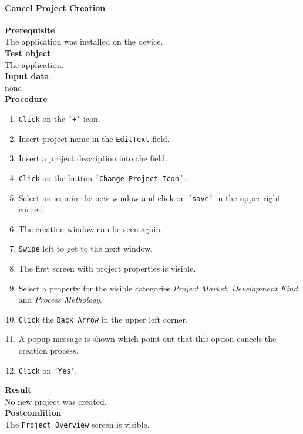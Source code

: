 \paragraph*{\textbf{Cancel Project Creation}}
\textbf{Prerequisite}\\
The application was installed on the device.\\
\textbf{Test object}\\
The application.\\
\textbf{Input data}\\
none\\
\textbf{Procedure}
\begin{enumerate}
	\item \texttt{Click} on the \texttt{'+'} icon.
	\item Insert project name in the \texttt{EditText} field.
	\item Insert a project description into the field.
	\item \texttt{Click} on the button \texttt{'Change Project Icon'}.
	\item Select an icon in the new window and click on \texttt{'save'} in the upper right corner.
	\item The creation window can be seen again.
	\item \texttt{Swipe} left to get to the next window.
	\item The first screen with project properties is visible.
	\item Select a property for the visible categories \textit{Project Market}, \textit{Development Kind} and \textit{Process Methology}.
	\item \texttt{Click} the \texttt{Back Arrow} in the upper left corner.
	\item A popup message is shown which point out that this option cancels the creation process.
	\item \texttt{Click} on \texttt{'Yes'}.
\end{enumerate}
\textbf{Result}\\
No new project was created.\\
\textbf{Postcondition}\\
The \texttt{Project Overview} screen is visible.
